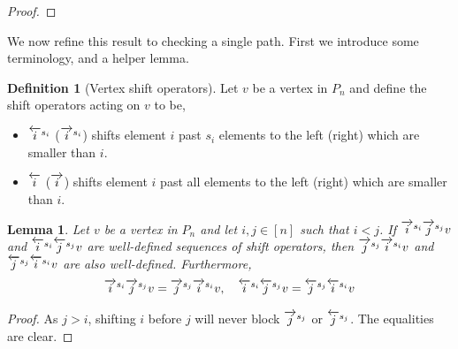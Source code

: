 \documentclass{amsart}
\newtheorem{lemma}[theorem]{Lemma}
\theoremstyle{definition}
\newtheorem{definition}[theorem]{Definition}
\newcommand{\rightshift}[1]{\overrightarrow{\vphantom{1}{#1}}}
\newcommand{\rightshiftk}[2]{\overrightarrow{\vphantom{1}{#1}}^{#2}}
\newcommand{\leftshift}[1]{\overleftarrow{\vphantom{1}{#1}}}
\newcommand{\leftshiftk}[2]{\overleftarrow{\vphantom{1}{#1}}^{#2}}
\begin{document}
\begin{proof}
\end{proof}

We now refine this result to checking a single path.
First we introduce some terminology, and a helper lemma.

\begin{definition}[Vertex shift operators]
Let $v$ be a vertex in $P_n$ and define the shift operators acting on $v$ to be,
\begin{itemize}
    \item $\leftshiftk{i}{s_i}$ ($\rightshiftk{i}{s_i}$) shifts element $i$ past $s_i$ elements to the left (right) which are smaller than $i$.
    \item $\leftshift{i}$ ($\rightshift{i}$) shifts element $i$ past all elements to the left (right) which are smaller than $i$.
\end{itemize}
\end{definition}

\begin{lemma}\label{lem:Interchanging shift operators}
Let $v$ be a vertex in $P_n$ and let $i,j \in [n]$ such that $i<j$. If $\rightshiftk{i}{s_i}\rightshiftk{j}{s_j} v$ and $\leftshiftk{i}{s_i}\leftshiftk{j}{s_j} v$ are well-defined sequences of shift operators, then $\rightshiftk{j}{s_j}\rightshiftk{i}{s_i} v$ and $\leftshiftk{j}{s_j}\leftshiftk{i}{s_i} v$ are also well-defined.
Furthermore,
\begin{align*}
    \rightshiftk{i}{s_i}\rightshiftk{j}{s_j} v = \rightshiftk{j}{s_j}\rightshiftk{i}{s_i} v, \quad 
    \leftshiftk{i}{s_i}\leftshiftk{j}{s_j} v = \leftshiftk{j}{s_j}\leftshiftk{i}{s_i} v
\end{align*}
\end{lemma}
\begin{proof}
As $j>i$, shifting $i$ before $j$ will never block $\rightshiftk{j}{s_j}$ or $\leftshiftk{j}{s_j}$. The equalities are clear.
\end{proof}
\end{document}

